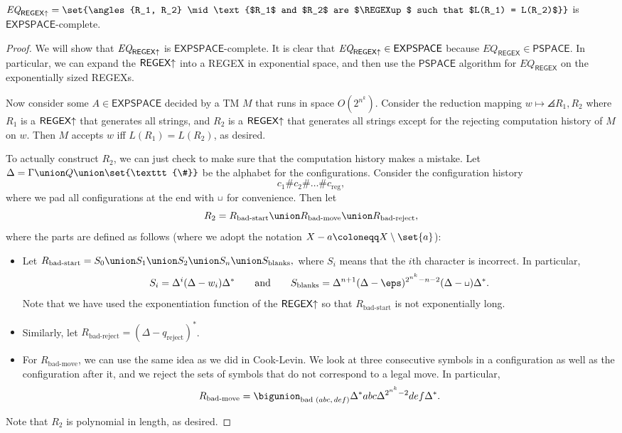 \documentclass{standalone}
\begin{document}
\begin{theorem}
	\(\textit{EQ}_{\REGEXup} = \set{\angles{R_1, R_2} \mid \text{%
		$R_1$ and $R_2$ are $\REGEXup$ such that $L(R_1) = L(R_2)$%
	}}\) is \(\mathsf{EXPSPACE}\)-complete.
\end{theorem}
\begin{proof}
	We will show that \(\textit{EQ}_{\textsf{REGEX}\mathord\uparrow}\) is \(\mathsf{EXPSPACE}\)-complete. It is clear that \(\textit{EQ}_{\textsf{REGEX}\mathord\uparrow} \in \mathsf{EXPSPACE}\) because \(\textit{EQ}_{\textsf{REGEX}} \in \mathsf{PSPACE}\). In particular, we can expand the \(\textsf{REGEX}\mathord\uparrow\) into a \textsf{REGEX} in exponential space, and then use the \(\mathsf{PSPACE}\) algorithm for \(\textit{EQ}_{\textsf{REGEX}}\) on the exponentially sized \textsf{REGEX}s.

	Now consider some \(A \in \mathsf{EXPSPACE}\) decided by a \textsf{TM} \(M\) that runs in space \(O(2^{n^k})\). Consider the reduction mapping \(w \mapsto \angles{R_1, R_2}\) where \(R_1\) is a \(\textsf{REGEX}\mathord\uparrow\) that generates all strings, and \(R_2\) is a \(\textsf{REGEX}\mathord\uparrow\) that generates all strings except for the rejecting computation history of \(M\) on \(w\). Then \(M\) accepts \(w\) iff \(L(R_1) = L(R_2)\), as desired.

	To actually construct \(R_2\), we can just check to make sure that the computation history makes a mistake. Let \(\Delta = \Gamma \union Q \union \set{\texttt{\#}}\) be the alphabet for the configurations.
	Consider the configuration history
	\[
		c_1 \texttt{\#} c_2 \texttt{\#} \dots \texttt{\#} c_{\text{reg}},
	\]
	where we pad all configurations at the end with \(\blank\) for convenience. Then let
	\[
		R_2 = R_{\text{bad-start}} \union R_{\text{bad-move}} \union R_{\text{bad-reject}},
	\]
	where the parts are defined as follows (where we adopt the notation \(X - a \coloneqq X \setminus \set{a}\)):
	\begin{itemize}
		\item Let \(R_{\text{bad-start}} = S_0 \union S_1 \union S_2 \union S_n \union S_{\text{blanks}},\) where \(S_i\) means that the \(i\)th character is incorrect. In particular,
		\[
			S_i = \Delta^i (\Delta - w_i) \Delta^*
				\qquad \text{and} \qquad
				S_{\text{blanks}} = \Delta^{n + 1} (\Delta - \eps)^{2^{n^k} - n - 2} (\Delta - \blank) \Delta^*.
		\]
		Note that we have used the exponentiation function of the \(\textsf{REGEX}\mathord\uparrow\) so that \(R_{\text{bad-start}}\) is not exponentially long.

		\item Similarly, let \(R_{\text{bad-reject}} = (\Delta - q_{\text{reject}})^*\).

		\item For \(R_{\text{bad-move}}\), we can use the same idea as we did in Cook-Levin. We look at three consecutive symbols in a configuration as well as the configuration after it, and we reject the sets of symbols that do not correspond to a legal move. In particular,
		\[
			R_{\text{bad-move}} = \bigunion_{\text{bad $(abc, def)$}} \Delta^* abc \Delta^{2^{n^k} - 2} def \Delta^*.
		\]
	\end{itemize}

	Note that \(R_2\) is polynomial in length, as desired.
\end{proof}
\end{document}
